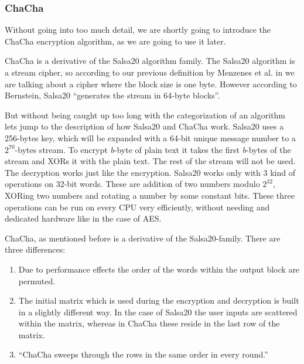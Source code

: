 \documentclass[12pt,a4paper,titlepage,oneside]{scrartcl}
\begin{document}
\subsubsection{ChaCha}
Without going into too much detail, we are shortly going to introduce the ChaCha encryption algorithm, as we are going to use it later.

ChaCha is a derivative of the Salsa20 algorithm family. 
The Salsa20 algorithm is a stream cipher, so according to our previous definition by Menzenes et al. in \cite{menezes1996handbook} we are talking about a cipher where the block size is one byte.
However according to Bernstein, Salsa20 ``generates the stream in 64-byte blocks''. \cite{bernstein2008salsa20}

But without being caught up too long with the categorization of an algorithm lets jump to the description of how Salsa20 and ChaCha work.
Salsa20 uses a 256-bytes key, which will be expanded with a 64-bit unique message number to a \begin{math} 2^{70} \end{math}-bytes stream.
To encrypt \textit{b}-byte of plain text it takes the first \textit{b}-bytes of the stream and XORs it with the plain text.
The rest of the stream will not be used.
The decryption works just like the encryption.
Salsa20 works only with 3 kind of operations on 32-bit words.
These are addition of two numbers modulo \begin{math} 2^{32} \end{math}, XORing two numbers and rotating a number by some constant bits.
These three operations can be run on every CPU very efficiently, without needing and dedicated hardware like in the case of AES. \cite{bernstein2008salsa20}

ChaCha, as mentioned before is a derivative of the Salsa20-family.
There are three differences:
\begin{enumerate}
  \item Due to performance effects the order of the words within the output block are permuted.
  \item The initial matrix which is used during the encryption and decryption is built in a slightly different way.
    In the case of Salsa20 the user inputs are scattered within the matrix, whereas in ChaCha these reside in the last row of the matrix.
  \item ``ChaCha sweeps through the rows in the same order in every round.''
\end{enumerate}
\cite{bernstein2008chacha}
\end{document}
